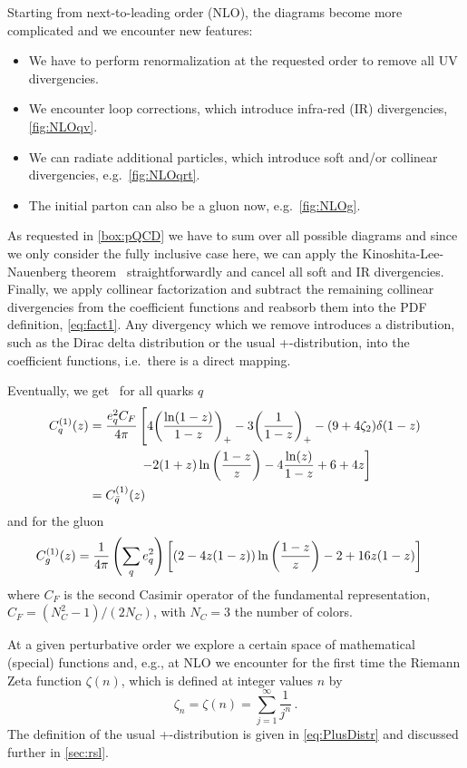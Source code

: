 Starting from next-to-leading order (NLO), the diagrams become more complicated and we encounter new features:
\begin{itemize}
    \item We have to perform renormalization at the requested order to remove all UV divergencies.
    \item We encounter loop corrections, which introduce infra-red (IR) divergencies, \cref{fig:NLOqv}.
    \item We can radiate additional particles, which introduce soft and/or collinear divergencies, e.g.\ \cref{fig:NLOqrt}.
    \item The initial parton can also be a gluon now, e.g.\ \cref{fig:NLOg}.
\end{itemize}
As requested in \cref{box:pQCD} we have to sum over all possible diagrams and since we only consider the fully inclusive case here, we can apply the Kinoshita-Lee-Nauenberg theorem~\cite{Bloch:1937pw,Kinoshita:1962ur,Lee:1964is} straightforwardly and cancel all soft and IR divergencies.
Finally, we apply collinear factorization and subtract the remaining collinear divergencies from the coefficient functions and reabsorb them into the PDF definition, \cref{eq:fact1}.
Any divergency which we remove introduces a distribution, such as the Dirac delta distribution or the usual +-distribution, into the coefficient functions, i.e.\ there is a direct mapping.

Eventually, we get~\cite{Vermaseren:2005qc} for all quarks $q$
\begin{align}
    C_q^{(1)}(z) &= \frac{e_q^2 C_F}{4\pi} \left[ 4 \qty(\frac{\ln(1-z)}{1-z})_+ - 3 \qty(\frac{1}{1-z})_+ - \qty(9+4\zeta_2)\delta(1-z)\right. \nonumber\\
    & \hspace{40pt} \left. - 2(1+z)\ln\left(\frac{1-z}{z}\right) - 4 \frac{\ln(z)}{1-z} + 6 + 4z\right] \label{eq:NLOCq}\\
     &= C_{\bar q}^{(1)}(z)
\end{align}
and for the gluon
\begin{align}
    C_g^{(1)}(z) &=\frac 1 {4\pi} \left(\sum_q e_q^2\right) \left[ \qty(2 - 4 z (1 - z)) \ln\left(\frac{1 - z} z\right)  - 2 + 16 z (1 - z)  \right] \label{eq:NLOCg}
\end{align}
where $C_F$ is the second Casimir operator of the fundamental representation, $C_F = (N_C^2 - 1)/(2 N_C)$, with $N_C=3$ the number of colors.

At a given perturbative order we explore a certain space of mathematical (special) functions and, e.g., at NLO we encounter for the first time the Riemann Zeta function $\zeta(n)$, which is defined at integer values $n$ by
\begin{equation}
    \zeta_n = \zeta(n) = \sum\limits_{j=1}^\infty \frac 1 {j^n}\,.
\end{equation}
The definition of the usual +-distribution is given in \cref{eq:PlusDistr} and discussed further in \cref{sec:rsl}.
